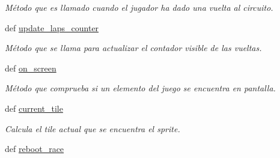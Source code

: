 \begin{DoxyCompactItemize}
\begin{DoxyCompactList}\small\item\em \-Método que es llamado cuando el jugador ha dado una vuelta al circuito. \end{DoxyCompactList}\item 
\hypertarget{classengine_1_1gamecontrol_1_1GameControl_a5bc6b0d4423caee608f3892ea241afe1}{
def \hyperlink{classengine_1_1gamecontrol_1_1GameControl_a5bc6b0d4423caee608f3892ea241afe1}{update\-\_\-laps\-\_\-counter}}
\label{classengine_1_1gamecontrol_1_1GameControl_a5bc6b0d4423caee608f3892ea241afe1}

\begin{DoxyCompactList}\small\item\em \-Método que se llama para actualizar el contador visible de las vueltas. \end{DoxyCompactList}\item 
def \hyperlink{classengine_1_1gamecontrol_1_1GameControl_afa6b2d1e883f298c47e1db8a4e321860}{on\-\_\-screen}
\begin{DoxyCompactList}\small\item\em \-Método que comprueba si un elemento del juego se encuentra en pantalla. \end{DoxyCompactList}\item 
def \hyperlink{classengine_1_1gamecontrol_1_1GameControl_af493acc51f8a9db941235c627cf2408f}{current\-\_\-tile}
\begin{DoxyCompactList}\small\item\em \-Calcula el tile actual que se encuentra el sprite. \end{DoxyCompactList}\item 
\hypertarget{classengine_1_1gamecontrol_1_1GameControl_ac0c1ae80cf0db6a534351a51e83ea732}{
def \hyperlink{classengine_1_1gamecontrol_1_1GameControl_ac0c1ae80cf0db6a534351a51e83ea732}{reboot\-\_\-race}}
\label{classengine_1_1gamecontrol_1_1GameControl_ac0c1ae80cf0db6a534351a51e83ea732}


\end{DoxyCompactItemize}
